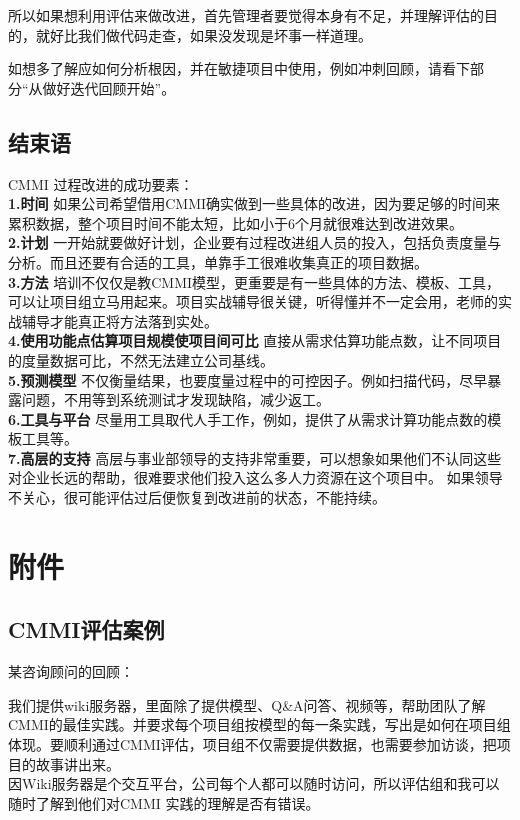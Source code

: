 所以如果想利用评估来做改进，首先管理者要觉得本身有不足，并理解评估的目的，就好比我们做代码走查，如果没发现是坏事一样道理。

如想多了解应如何分析根因，并在敏捷项目中使用，例如冲刺回顾，请看下部分``从做好迭代回顾开始''。

\hypertarget{ux603bux7ed3}{%
\subsection{结束语}\label{ux603bux7ed3}}

CMMI 过程改进的成功要素：\\
\textbf{1.时间}
如果公司希望借用CMMI确实做到一些具体的改进，因为要足够的时间来累积数据，整个项目时间不能太短，比如小于6个月就很难达到改进效果。\\
\textbf{2.计划}
一开始就要做好计划，企业要有过程改进组人员的投入，包括负责度量与分析。而且还要有合适的工具，单靠手工很难收集真正的项目数据。\\
\textbf{3.方法}
培训不仅仅是教CMMI模型，更重要是有一些具体的方法、模板、工具，可以让项目组立马用起来。项目实战辅导很关键，听得懂并不一定会用，老师的实战辅导才能真正将方法落到实处。\\
\textbf{4.使用功能点估算项目规模使项目间可比}
直接从需求估算功能点数，让不同项目的度量数据可比，不然无法建立公司基线。\\
\textbf{5.预测模型}
不仅衡量结果，也要度量过程中的可控因子。例如扫描代码，尽早暴露问题，不用等到系统测试才发现缺陷，减少返工。\\
\textbf{6.工具与平台}
尽量用工具取代人手工作，例如，提供了从需求计算功能点数的模板工具等。\\
\textbf{7.高层的支持}
高层与事业部领导的支持非常重要，可以想象如果他们不认同这些对企业长远的帮助，很难要求他们投入这么多人力资源在这个项目中。
如果领导不关心，很可能评估过后便恢复到改进前的状态，不能持续。

\hypertarget{ux9644ux4ef6}{%
\section{附件}\label{ux9644ux4ef6}}

\hypertarget{cmmiux8bc4ux4f30ux6848ux4f8b}{%
\subsection{CMMI评估案例}\label{cmmiux8bc4ux4f30ux6848ux4f8b}}

某咨询顾问的回顾：

我们提供wiki服务器，里面除了提供模型、Q\&A问答、视频等，帮助团队了解CMMI的最佳实践。并要求每个项目组按模型的每一条实践，写出是如何在项目组体现。要顺利通过CMMI评估，项目组不仅需要提供数据，也需要参加访谈，把项目的故事讲出来。\\
因Wiki服务器是个交互平台，公司每个人都可以随时访问，所以评估组和我可以随时了解到他们对CMMI
实践的理解是否有错误。\\


